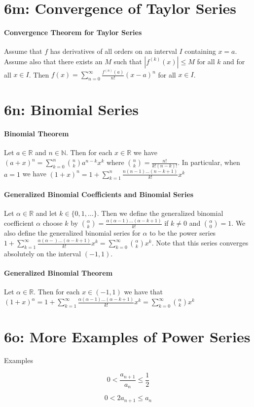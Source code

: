 \documentclass[10pt,letter]{article}
\begin{document}
\section*{6m: Convergence of Taylor Series}
\paragraph{Convergence Theorem for Taylor Series}
Assume that $f$ has derivatives of all orders on an interval $I$ containing $x=a$. Assume also that there exists an $M$ such that $|f^{(k)}(x)|\leq M$ for all $k$ and for all $x\in I$. Then $f(x)=\sum_{n=0}^\infty\frac{f^{(n)}(a)}{n!}(x-a)^n$ for all $x\in I$.


\section*{6n: Binomial Series}
\paragraph{Binomial Theorem}
Let $a\in\mathbb{R}$ and $n\in\mathbb{N}$. Then for each $x\in\mathbb{R}$ we have $(a+x)^n=\sum_{k=0}^n{n\choose k}a^{n-k}x^k$ where ${n\choose k}=\frac{n!}{k!(n-k)!}$. In particular, when $a=1$ we have $(1+x)^n=1+\sum_{k=1}^n\frac{n(n-1)\ldots(n-k+1)}{k!}x^k$
\paragraph{Generalized Binomial Coefficients and Binomial Series}
Let $\alpha\in\mathbb{R}$ and let $k\in\{0,1,\ldots\}$. Then we define the generalized binomial coefficient $\alpha$ choose $k$ by ${\alpha\choose k}=\frac{\alpha(\alpha-1)\ldots(\alpha-k+1)}{k!}$ if $k\neq0$ and ${\alpha\choose 0}=1$. We also define the generalized binomial series for $\alpha$ to be the power series $1+\sum_{k=1}^\infty\frac{\alpha(\alpha-)\ldots(\alpha-k+1)}{k!}x^k=\sum_{k=0}^\infty{\alpha\choose k}x^k$. Note that this series converges absolutely on the interval $(-1,1)$. 
\paragraph{Generalized Binomial Theorem}
Let $\alpha\in\mathbb{R}$. Then for each $x\in(-1,1)$ we have that $(1+x)^\alpha=1+\sum_{k=1}^\infty\frac{\alpha(\alpha-1)\ldots(\alpha-k+1)}{k!}x^k=\sum_{k=0}^\infty{\alpha\choose k}x^k$

\section*{6o: More Examples of Power Series}
Examples


$$0<\frac{a_{n+1}}{a_n}\leq\frac{1}{2}$$

$$0<2a_{n+1}\leq a_n$$
\end{document}
